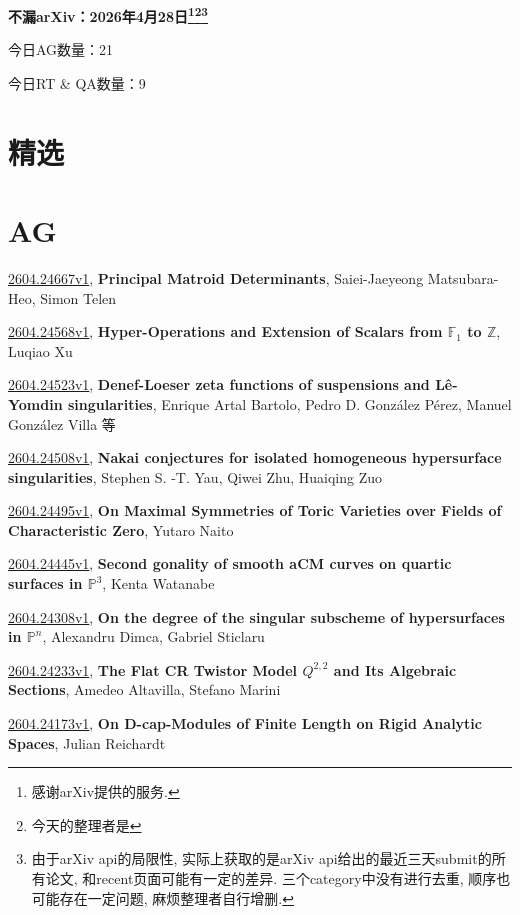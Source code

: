 \documentclass[9pt, a4paper]{article}
\theoremstyle{plain}
\theoremstyle{definition}
\theoremstyle{remark}
\newcommand{\arxiv}[3]{\href{https://arxiv.org/abs/#1}{#1}, \textbf{\textcolor{arxivblue}{#2}}, #3}
\newcommand{\AGnumber}{21}
\newcommand{\RTQAnumber}{9}
\newcommand{\NewestDate}{2026年4月28日}
\newcommand{\todayarXiver}{} %
\begin{document}
\begin{center}
    \Huge\textbf{不漏arXiv：\NewestDate\footnote{感谢arXiv提供的服务.}\footnote{今天的整理者是\todayarXiver}\footnote{由于arXiv api的局限性, 实际上获取的是arXiv api给出的最近三天submit的所有论文, 和recent页面可能有一定的差异. 三个category中没有进行去重, 顺序也可能存在一定问题, 麻烦整理者自行增删.}} \\
\end{center}

\setcounter{section}{-1}

\begin{center}
    今日AG数量：\AGnumber
    
    今日RT \& QA数量：\RTQAnumber
    
\end{center}


\section{精选}


\section{AG}
\arxiv{2604.24667v1}{Principal Matroid Determinants}{Saiei-Jaeyeong Matsubara-Heo, Simon Telen}

\arxiv{2604.24568v1}{Hyper-Operations and Extension of Scalars from $\mathbb{F}_1$ to $\mathbb{Z}$}{Luqiao Xu}

\arxiv{2604.24523v1}{Denef-Loeser zeta functions of suspensions and Lê-Yomdin singularities}{Enrique Artal Bartolo, Pedro D. González Pérez, Manuel González Villa 等}

\arxiv{2604.24508v1}{Nakai conjectures for isolated homogeneous hypersurface singularities}{Stephen S. -T. Yau, Qiwei Zhu, Huaiqing Zuo}

\arxiv{2604.24495v1}{On Maximal Symmetries of Toric Varieties over Fields of Characteristic Zero}{Yutaro Naito}

\arxiv{2604.24445v1}{Second gonality of smooth aCM curves on quartic surfaces in $\mathbb{P}^3$}{Kenta Watanabe}

\arxiv{2604.24308v1}{On the degree of the singular subscheme of hypersurfaces in ${\mathbb P}^n$}{Alexandru Dimca, Gabriel Sticlaru}

\arxiv{2604.24233v1}{The Flat CR Twistor Model $Q^{2,2}$ and Its Algebraic Sections}{Amedeo Altavilla, Stefano Marini}

\arxiv{2604.24173v1}{On D-cap-Modules of Finite Length on Rigid Analytic Spaces}{Julian Reichardt}
\end{document}
